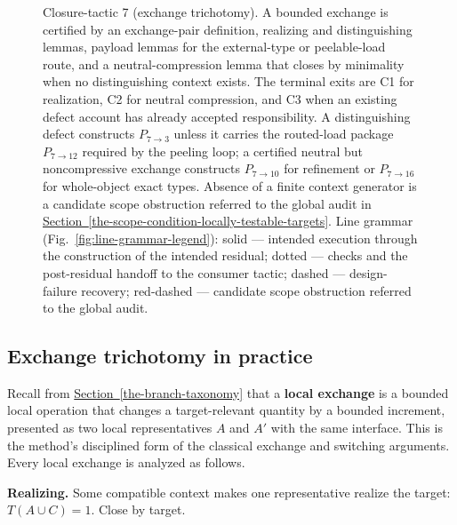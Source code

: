 \documentclass[
  11pt,
]{article}
\theoremstyle{definition}
\newcommand{\secref}[1]{\hyperref[#1]{Section~\ref*{#1}}}
\begin{document}
\begin{figure}[p]
{%
}
\caption[Closure-tactic 7: exchange trichotomy]{Closure-tactic 7 (exchange trichotomy).  A bounded exchange is certified by an exchange-pair definition, realizing and distinguishing lemmas, payload lemmas for the external-type or peelable-load route, and a neutral-compression lemma that closes by minimality when no distinguishing context exists.  The terminal exits are C1 for realization, C2 for neutral compression, and C3 when an existing defect account has already accepted responsibility.  A distinguishing defect constructs \(P_{7\to3}\) unless it carries the routed-load package \(P_{7\to12}\) required by the peeling loop; a certified neutral but noncompressive exchange constructs \(P_{7\to10}\) for refinement or \(P_{7\to16}\) for whole-object exact types.  Absence of a finite context generator is a candidate scope obstruction referred to the global audit in \secref{the-scope-condition-locally-testable-targets}.  Line grammar (Fig.~\ref{fig:line-grammar-legend}): solid --- intended execution through the construction of the intended residual; dotted --- checks and the post-residual handoff to the consumer tactic; dashed --- design-failure recovery; red-dashed --- candidate scope obstruction referred to the global audit.}
\label{fig:ct7-exchange-trichotomy}
\end{figure}
\FloatBarrier

\subsection*{Exchange trichotomy in practice}

Recall from \secref{the-branch-taxonomy} that a \textbf{local exchange} is a bounded local
operation that changes a target-relevant quantity by a bounded
increment, presented as two local representatives \(A\) and \(A'\) with
the same interface. This is the method's disciplined form of the
classical exchange and switching arguments. Every local exchange is
analyzed as follows.

\textbf{Realizing.} Some compatible context makes one representative
realize the target: $T(A\cup C)=1$. Close by target.
\end{document}
